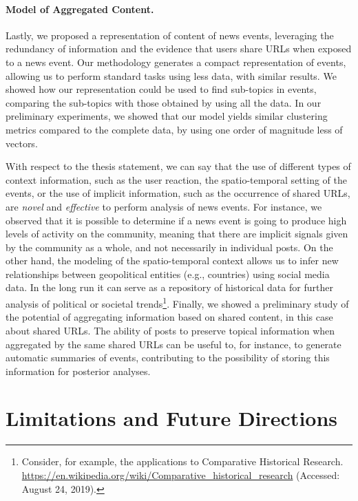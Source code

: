 \paragraph{Model of Aggregated Content.}
%
Lastly, we proposed a representation of content of news events, leveraging the
redundancy of information and the evidence that users share URLs when exposed to
a news event.
%
Our methodology generates a compact representation of events, allowing us to
perform standard tasks using less data, with similar results.
%
We showed how our representation could be used to find sub-topics in events,
comparing the sub-topics with those obtained by using all the data.
%
In our preliminary experiments, we showed that our model yields similar
clustering metrics compared to the complete data, by using one order of
magnitude less of vectors.


With respect to the thesis statement, we can say that the use of different types
of context information, such as the user reaction, the spatio-temporal setting
of the events, or the use of implicit information, such as the occurrence of
shared URLs, are {\em novel} and {\em effective} to perform analysis of news events. 
%
For instance, we observed that it is possible to determine if a news event is
going to produce high levels of activity on the community, meaning that there
are implicit signals given by the community as a whole, and not necessarily in
individual posts.
%
On the other hand, the modeling of the spatio-temporal context allows us to
infer new relationships between geopolitical entities (e.g., countries) using
social media data.
%
In the long run it can serve as a repository of historical data for further
analysis of political or societal trends\footnote{Consider, for example, the
applications to Comparative Historical Research.
\url{https://en.wikipedia.org/wiki/Comparative_historical_research} (Accessed:
August 24, 2019).}.
%
Finally, we showed a preliminary study of the potential of aggregating
information based on shared content, in this case about shared URLs.
%
The ability of posts to preserve topical information when aggregated by the same
shared URLs can be useful to, for instance, to generate automatic summaries of
events, contributing to the possibility of storing this information for posterior
analyses.




\section{Limitations and Future Directions}

